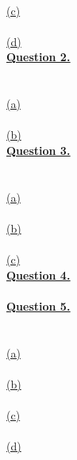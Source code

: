 \documentclass[12pt]{article}
\begin{document}
\noindent ~\\\hyperlink{toc}{\hypertarget{1.3}{(c)}}\\
\noindent ~\\\hyperlink{toc}{\hypertarget{1.4}{(d)}}\\
\newpage
\noindent \hyperlink{toc}{\LARGE \underline{\textbf{Question 2.}}}\\\\
\noindent ~\\\hyperlink{toc}{\hypertarget{2.1}{(a)}}\\
\noindent ~\\\hyperlink{toc}{\hypertarget{2.2}{(b)}}\\
\newpage
\noindent \hyperlink{toc}{{\LARGE \underline{\textbf{Question 3.}}}}\\\\
\noindent ~\\\hyperlink{toc}{\hypertarget{3.1}{(a)}}\\
\noindent ~\\\hyperlink{toc}{\hypertarget{3.2}{(b)}}\\
\noindent ~\\\hyperlink{toc}{\hypertarget{3.3}{(c)}}\\
\newpage
\noindent \hyperlink{toc}{\hypertarget{4}{\LARGE \underline{\textbf{Question 4.}}}}\\\\
\newpage
\noindent \hyperlink{toc}{{\LARGE \underline{\textbf{Question 5.}}}}\\\\
\noindent ~\\\hyperlink{toc}{\hypertarget{5.1}{(a)}}\\
\noindent ~\\\hyperlink{toc}{\hypertarget{5.2}{(b)}}\\
\noindent ~\\\hyperlink{toc}{\hypertarget{5.3}{(c)}}\\
\noindent ~\\\hyperlink{toc}{\hypertarget{5.4}{(d)}}\\
\newpage
\end{document}
